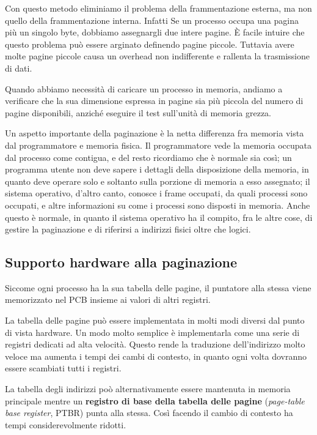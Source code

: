         Con questo metodo eliminiamo il problema della frammentazione esterna, ma non quello della frammentazione interna. Infatti Se un processo occupa una pagina più un singolo byte, dobbiamo assegnargli due intere pagine. È facile intuire che questo problema può essere arginato definendo pagine piccole. Tuttavia avere molte pagine piccole causa un overhead non indifferente e rallenta la trasmissione di dati.
        
        Quando abbiamo necessità di caricare un processo in memoria, andiamo a verificare che la sua dimensione espressa in pagine sia più piccola del numero di pagine disponibili, anziché eseguire il test sull'unità di memoria grezza.
        
        Un aspetto importante della paginazione è la netta differenza fra memoria vista dal programmatore e memoria fisica. Il programmatore vede la memoria occupata dal processo come contigua, e del resto ricordiamo che è normale sia così; un programma utente non deve sapere i dettagli della disposizione della memoria, in quanto deve operare solo e soltanto sulla porzione di memoria a esso assegnato; il sistema operativo, d'altro canto, conosce i frame occupati, da quali processi sono occupati, e altre informazioni su come i processi sono disposti in memoria. Anche questo è normale, in quanto il sistema operativo ha il compito, fra le altre cose, di gestire la paginazione e di riferirsi a indirizzi fisici oltre che logici.
        
    \subsection{Supporto hardware alla paginazione}
        Siccome ogni processo ha la sua tabella delle pagine, il puntatore alla stessa viene memorizzato nel PCB insieme ai valori di altri registri.
        
        La tabella delle pagine può essere implementata in molti modi diversi dal punto di vista hardware. Un modo molto semplice è implementarla come una serie di registri dedicati ad alta velocità. Questo rende la traduzione dell'indirizzo molto veloce ma aumenta i tempi dei cambi di contesto, in quanto ogni volta dovranno essere scambiati tutti i registri.
        
        La tabella degli indirizzi poò alternativamente essere mantenuta in memoria principale mentre un \textbf{registro di base della tabella delle pagine} (\textit{page-table base register}, PTBR) punta alla stessa. Così facendo il cambio di contesto ha tempi considerevolmente ridotti.
        
